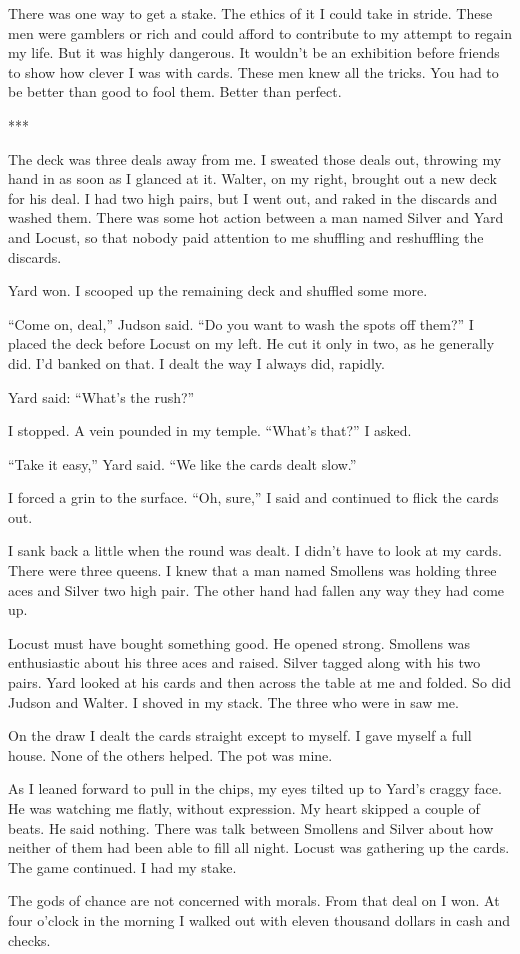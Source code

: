 {There was one way to get a stake. The ethics of it I could take in stride. These men were gamblers or rich and could afford to contribute to my attempt to regain my life. But it was highly dangerous. It wouldn’t be an exhibition before friends to show how clever I was with cards. These men knew all the tricks. You had to be better than good to fool them. Better than perfect.

***

The deck was three deals away from me. I sweated those deals out, throwing my hand in as soon as I glanced at it. Walter, on my right, brought out a new deck for his deal. I had two high pairs, but I went out, and raked in the discards and washed them. There was some hot action between a man named Silver and Yard and Locust, so that nobody paid attention to me shuffling and reshuffling the discards.

Yard won. I scooped up the remaining deck and shuffled some more.

“Come on, deal,” Judson said. “Do you want to wash the spots off them?” I placed the deck before Locust on my left. He cut it only in two, as he generally did. I’d banked on that. I dealt the way I always did, rapidly.

Yard said: “What’s the rush?”

I stopped. A vein pounded in my temple. “What’s that?” I asked.

“Take it easy,” Yard said. “We like the cards dealt slow.”

I forced a grin to the surface. “Oh, sure,” I said and continued to flick the cards out.

I sank back a little when the round was dealt. I didn’t have to look at my cards. There were three queens. I knew that a man named Smollens was holding three aces and Silver two high pair. The other hand had fallen any way they had come up.

Locust must have bought something good. He opened strong. Smollens was enthusiastic about his three aces and raised. Silver tagged along with his two pairs. Yard looked at his cards and then across the table at me and folded. So did Judson and Walter. I shoved in my stack. The three who were in saw me.

On the draw I dealt the cards straight except to myself. I gave myself a full house. None of the others helped. The pot was mine.

As I leaned forward to pull in the chips, my eyes tilted up to Yard’s craggy face. He was watching me flatly, without expression. My heart skipped a couple of beats. He said nothing. There was talk between Smollens and Silver about how neither of them had been able to fill all night. Locust was gathering up the cards. The game continued. I had my stake.

The gods of chance are not concerned with morals. From that deal on I won. At four o’clock in the morning I walked out with eleven thousand dollars in cash and checks.

}

